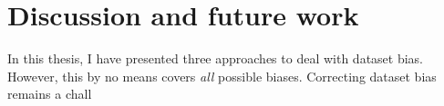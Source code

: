 \chapter{Discussion and future work}\label{ch:conclusion}
In this thesis, I have presented three approaches to deal with dataset bias.
However, this by no means covers \emph{all} possible biases.
Correcting dataset bias remains a chall
